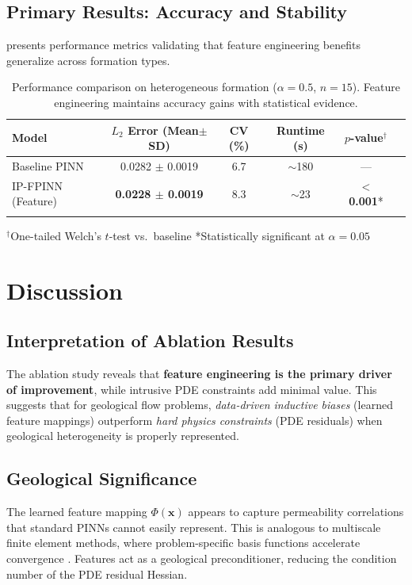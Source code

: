 \documentclass[sn-mathphys]{sn-jnl}
\begin{document}
	\subsection{Primary Results: Accuracy and Stability}
	 presents performance metrics validating that feature engineering benefits generalize across formation types.
	
	\begin{table}[htbp]
		\centering
		\caption{Performance comparison on heterogeneous formation ($\alpha=0.5$, $n=15$). Feature engineering maintains accuracy gains with statistical evidence.}
		\label{tab:performance}
		\begin{tabular}{@{}lccccc@{}}
			\toprule
			\textbf{Model} & \textbf{$L_2$ Error (Mean$\pm$SD)} & \textbf{CV (\%)} & \textbf{Runtime (s)} & \textbf{$p$-value$^\dagger$} \\
			\midrule
			Baseline PINN & 0.0282 $\pm$ 0.0019 & 6.7 & $\sim$180 & --- \\
			IP-FPINN (Feature) & \textbf{0.0228 $\pm$ 0.0019} & 8.3 & $\sim$23 & \textbf{$<$0.001}* \\
			\bottomrule
			\vspace{4pt}
		\end{tabular}
	
		$^\dagger$One-tailed Welch's $t$-test vs.\ baseline *Statistically significant at $\alpha=0.05$
	\end{table}
	
	\section{Discussion}
	\label{sec:discussion}
	
	\subsection{Interpretation of Ablation Results}
	The ablation study reveals that \textbf{feature engineering is the primary driver of improvement}, while intrusive PDE constraints add minimal value. This suggests that for geological flow problems, \emph{data-driven inductive biases} (learned feature mappings) outperform \emph{hard physics constraints} (PDE residuals) when geological heterogeneity is properly represented.
	
	\subsection{Geological Significance}
	The learned feature mapping $\Phi(\mathbf{x})$ appears to capture permeability correlations that standard PINNs cannot easily represent. This is analogous to multiscale finite element methods, where problem-specific basis functions accelerate convergence \citep{krishnapriyan2021characterizing}. Features act as a geological preconditioner, reducing the condition number of the PDE residual Hessian.
	
\end{document}
